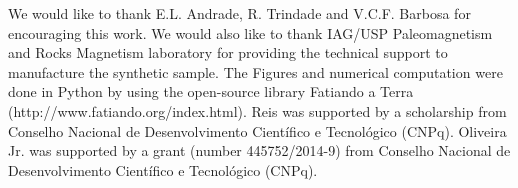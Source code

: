 \documentclass[draft,gc]{agutex}
\begin{document}
\begin{article}
%
%
%
%
%
%
%

\begin{acknowledgments}
We would like to thank E.L. Andrade, R. Trindade and V.C.F. Barbosa
for encouraging this work. We would also like to thank
IAG/USP Paleomagnetism and Rocks Magnetism laboratory for providing the
technical support to manufacture the synthetic sample.
The Figures and numerical computation were done in Python
by using the open-source library Fatiando a Terra 
(http://www.fatiando.org/index.html).
Reis was supported by a scholarship from Conselho Nacional 
de Desenvolvimento Cient\'{i}fico e Tecnol\'{o}gico (CNPq). 
Oliveira Jr. was supported by a grant (number 445752/2014-9)
from Conselho Nacional 
de Desenvolvimento Cient\'{i}fico e Tecnol\'{o}gico (CNPq).
\end{acknowledgments}

%
%
%
%
%
%


\end{article}
\end{document}
